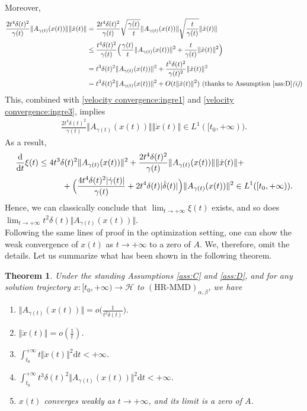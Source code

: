 \documentclass[11pt]{article}
\numberwithin{equation}{section}
\newtheorem{theorem}{Theorem}[section]
\begin{document}
Moreover,  
\begin{align*}
\frac{2t^4\delta(t)^2}{\gamma(t)}\Vert A_{\gamma(t)}(x(t)) \Vert \Vert \dot{x}(t) \Vert &=\frac{2t^4\delta(t)^2}{\gamma(t)}\sqrt{\frac{\gamma(t)}{t}}\Vert A_{\gamma(t)}(x(t)) \Vert \sqrt{\frac{t}{\gamma(t)}}\Vert \dot{x}(t) \Vert \\
&\le \frac{t^4\delta(t)^2}{\gamma(t)}\Big(\frac{\gamma(t)}{t}\Vert A_{\gamma(t)}(x(t)) \Vert^2+\frac{t}{\gamma(t)}\Vert \dot{x}(t) \Vert^2\Big) \\
&=t^3\delta(t)^2\Vert A_{\gamma(t)}(x(t)) \Vert^2+\frac{t^5\delta(t)^2}{\gamma(t)^2}\Vert \dot{x}(t) \Vert^2 \\
&=t^3\delta(t)^2\Vert A_{\gamma(t)}(x(t)) \Vert^2+O(t\Vert \dot{x}(t) \Vert^2) \text{ (thanks to Assumption \ref{ass:D}\textit{(i)})}
\end{align*}
This, combined with \eqref{velocity convergence:ingre1} and \eqref{velocity convergence:ingre3}, implies 
\begin{align*}
 \frac{2t^4\delta(t)^2}{\gamma(t)}\Vert A_{\gamma(t)}(x(t)) \Vert \Vert \dot{x}(t) \Vert  \in L^1([t_0,+\infty)).   
\end{align*}
As a result, 
\begin{align*}
    \frac{\mathrm{d}}{\mathrm{d}t}\xi(t) 
    &\le 4t^3\delta(t)^2\Vert A_{\gamma(t)}(x(t)) \Vert^2+\frac{2t^4\delta(t)^2}{\gamma(t)}\Vert A_{\gamma(t)}(x(t)) \Vert \Vert \dot{x}(t) \Vert+\\&\hskip1cm+\Big(\frac{4t^4\delta(t)^2\vert \dot{\gamma}(t)\vert}{\gamma(t)}+2t^4\delta(t)\vert \dot{\delta}(t)\vert\Big)\Vert A_{\gamma(t)}(x(t)) \Vert^2 
    \in L^1([t_0,+\infty)). 
\end{align*}
Hence, we can classically conclude that $\lim_{t \rightarrow+\infty} \xi(t)$ exists, and so does $\lim_{t \rightarrow+\infty} t^2\delta(t)\Big\Vert A_{\gamma(t)}(x(t)) \Big\Vert$. \\
Following the same lines of proof in the optimization setting, one can show the weak convergence of $x(t)$ as $t \to +\infty$ to a zero of $A$. We, therefore, omit the details.
Let us summarize what has been shown in the following theorem.
\begin{theorem}
Under the standing Assumptions \ref{ass:C} and \ref{ass:D}, and for any solution trajectory $x:[t_0,+\infty) \to \mathcal{H}$ to $(\text{HR-MMD})_{\alpha,\beta}$, we have 
\begin{enumerate}[label=(\roman*)]
        \item $\displaystyle \Vert A_{\gamma(t)}(x(t))\Vert=o\Big(\frac{1}{t^2\delta(t)}\Big).$
        \item $\Vert \dot{x}(t) \Vert = o(\frac{1}{t})$.
        \item $\displaystyle \int_{t_0}^{+\infty}t\Vert \dot{x}(t)\Vert^2\mathrm{d}t < +\infty$. 
        \item $\displaystyle \int_{t_0}^{+\infty}t^3\delta(t)^2\Vert A_{\gamma(t)}(x(t))\Vert^2 \mathrm{d}t <+\infty$.
        \item $x(t)$ converges weakly as $t \to +\infty$, and its limit is a zero of $A$.
    \end{enumerate}
\end{theorem}
\end{document}

